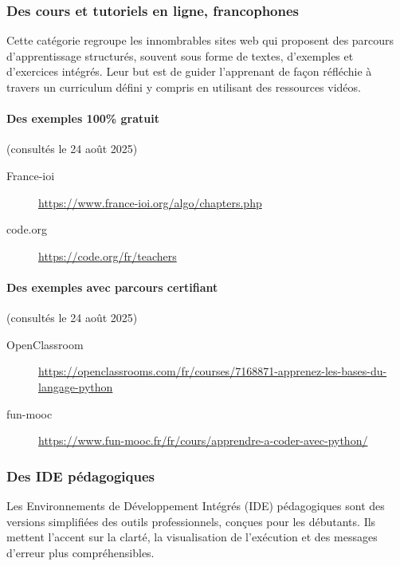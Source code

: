 \documentclass[11pt,a4paper]{article}
\begin{document}
\subsubsection*{Des cours et tutoriels en ligne, francophones}
Cette catégorie regroupe les innombrables sites web qui proposent des parcours d'apprentissage structurés, souvent sous forme de textes, d'exemples et d'exercices intégrés. Leur but est de guider l'apprenant de façon réfléchie à travers un curriculum défini y compris en utilisant des ressources vidéos. 

\paragraph{Des exemples 100\% gratuit}
(consultés le 24 août 2025) \begin{description}
    \item[France-ioi] \url{https://www.france-ioi.org/algo/chapters.php}
    \item[code.org] \url{https://code.org/fr/teachers}
\end{description}
\paragraph{Des exemples avec parcours certifiant}
(consultés le 24 août 2025) \begin{description}
    \item[OpenClassroom]
    \url{https://openclassrooms.com/fr/courses/7168871-apprenez-les-bases-du-langage-python}
    \item[fun-mooc] \url{https://www.fun-mooc.fr/fr/cours/apprendre-a-coder-avec-python/}
\end{description}


\subsubsection*{Des IDE pédagogiques}
Les Environnements de Développement Intégrés (IDE) pédagogiques sont des versions simplifiées des outils professionnels, conçues pour les débutants. Ils mettent l'accent sur la clarté, la visualisation de l'exécution et des messages d'erreur plus compréhensibles.
\end{document}
